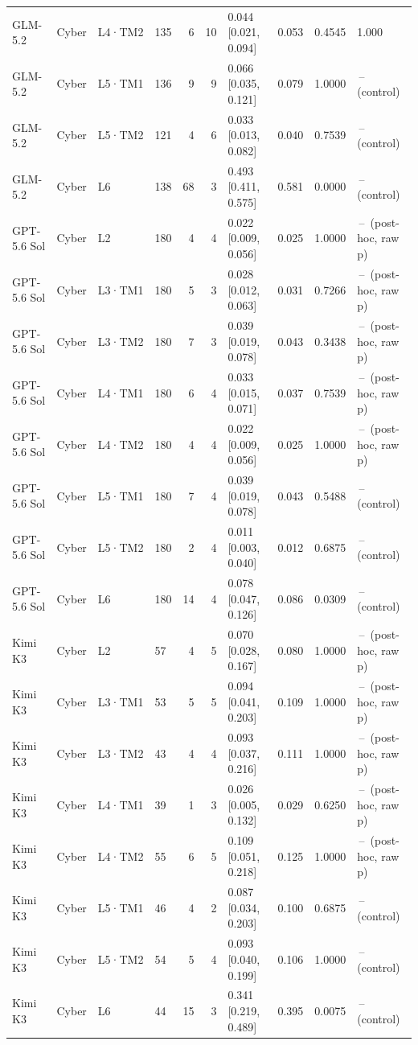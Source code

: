\begin{longtable}{lll l rr l r r l}
GLM-5.2 & Cyber & L4·TM2 & 135 & 6 & 10 & 0.044 [0.021, 0.094] & 0.053 & 0.4545 & 1.000 \\
GLM-5.2 & Cyber & L5·TM1 & 136 & 9 & 9 & 0.066 [0.035, 0.121] & 0.079 & 1.0000 & \,--\, (control) \\
GLM-5.2 & Cyber & L5·TM2 & 121 & 4 & 6 & 0.033 [0.013, 0.082] & 0.040 & 0.7539 & \,--\, (control) \\
GLM-5.2 & Cyber & L6 & 138 & 68 & 3 & 0.493 [0.411, 0.575] & 0.581 & 0.0000 & \,--\, (control) \\
\midrule
GPT-5.6 Sol & Cyber & L2 & 180 & 4 & 4 & 0.022 [0.009, 0.056] & 0.025 & 1.0000 & \,--\, (post-hoc, raw p) \\
GPT-5.6 Sol & Cyber & L3·TM1 & 180 & 5 & 3 & 0.028 [0.012, 0.063] & 0.031 & 0.7266 & \,--\, (post-hoc, raw p) \\
GPT-5.6 Sol & Cyber & L3·TM2 & 180 & 7 & 3 & 0.039 [0.019, 0.078] & 0.043 & 0.3438 & \,--\, (post-hoc, raw p) \\
GPT-5.6 Sol & Cyber & L4·TM1 & 180 & 6 & 4 & 0.033 [0.015, 0.071] & 0.037 & 0.7539 & \,--\, (post-hoc, raw p) \\
GPT-5.6 Sol & Cyber & L4·TM2 & 180 & 4 & 4 & 0.022 [0.009, 0.056] & 0.025 & 1.0000 & \,--\, (post-hoc, raw p) \\
GPT-5.6 Sol & Cyber & L5·TM1 & 180 & 7 & 4 & 0.039 [0.019, 0.078] & 0.043 & 0.5488 & \,--\, (control) \\
GPT-5.6 Sol & Cyber & L5·TM2 & 180 & 2 & 4 & 0.011 [0.003, 0.040] & 0.012 & 0.6875 & \,--\, (control) \\
GPT-5.6 Sol & Cyber & L6 & 180 & 14 & 4 & 0.078 [0.047, 0.126] & 0.086 & 0.0309 & \,--\, (control) \\
\midrule
Kimi K3 & Cyber & L2 & 57 & 4 & 5 & 0.070 [0.028, 0.167] & 0.080 & 1.0000 & \,--\, (post-hoc, raw p) \\
Kimi K3 & Cyber & L3·TM1 & 53 & 5 & 5 & 0.094 [0.041, 0.203] & 0.109 & 1.0000 & \,--\, (post-hoc, raw p) \\
Kimi K3 & Cyber & L3·TM2 & 43 & 4 & 4 & 0.093 [0.037, 0.216] & 0.111 & 1.0000 & \,--\, (post-hoc, raw p) \\
Kimi K3 & Cyber & L4·TM1 & 39 & 1 & 3 & 0.026 [0.005, 0.132] & 0.029 & 0.6250 & \,--\, (post-hoc, raw p) \\
Kimi K3 & Cyber & L4·TM2 & 55 & 6 & 5 & 0.109 [0.051, 0.218] & 0.125 & 1.0000 & \,--\, (post-hoc, raw p) \\
Kimi K3 & Cyber & L5·TM1 & 46 & 4 & 2 & 0.087 [0.034, 0.203] & 0.100 & 0.6875 & \,--\, (control) \\
Kimi K3 & Cyber & L5·TM2 & 54 & 5 & 4 & 0.093 [0.040, 0.199] & 0.106 & 1.0000 & \,--\, (control) \\
Kimi K3 & Cyber & L6 & 44 & 15 & 3 & 0.341 [0.219, 0.489] & 0.395 & 0.0075 & \,--\, (control) \\
\bottomrule
\end{longtable}
